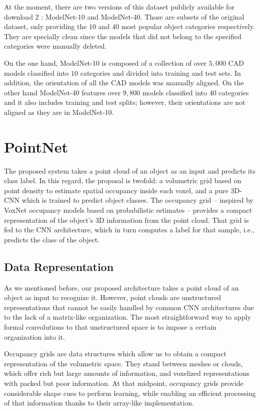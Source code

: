 At the moment, there are two versions of this dataset publicly available for download 2 : ModelNet-10 and ModelNet-40. Those are subsets of the original dataset, only providing the $10$ and $40$ most popular object categories respectively. They are specially clean since the models that did not belong to the specified categories were manually deleted.

On the one hand, ModelNet-10 is composed of a collection of over $5,000$ \ac{CAD} models classified into $10$ categories and divided into training and test sets. In addition, the orientation of all the \ac{CAD} models was manually aligned. On the other hand ModelNet-40 features over $9,800$ models classified into $40$ categories and it also includes training and test splits; however, their orientations are not aligned as they are in ModelNet-10.

\section{PointNet}
\label{cha:objrecog:sec:pointnet}

The proposed system takes a point cloud of an object as an input and predicts its class label. In this regard, the proposal is twofold: a volumetric grid based on point density to estimate spatial occupancy inside each voxel, and a pure \ac{3D}-\ac{CNN} which is trained to predict object classes. The occupancy grid -- inspired by VoxNet \cite{Maturana2015} occupancy models based on probabilistic estimates -- provides a compact representation of the object's 3D information from the point cloud. That grid is fed to the \ac{CNN} architecture, which in turn computes a label for that sample, i.e., predicts the class of the object.

\subsection{Data Representation}
\label{cha:objrecog:sec:pointnet:subsec:data}

As we mentioned before, our proposed architecture takes a point cloud of an object as input to recognize it. However, point clouds are unstructured representations that cannot be easily handled by common \ac{CNN} architectures due to the lack of a matrix-like organization. The most straightforward way to apply formal convolutions to that unstructured space is to impose a certain organization into it.

Occupancy grids are data structures which allow us to obtain a compact representation of the volumetric space. They stand between meshes or clouds, which offer rich but large amounts of information, and voxelized representations with packed but poor information. At that midpoint, occupancy grids provide considerable shape cues to perform learning, while enabling an efficient processing of that information thanks to their array-like implementation.


